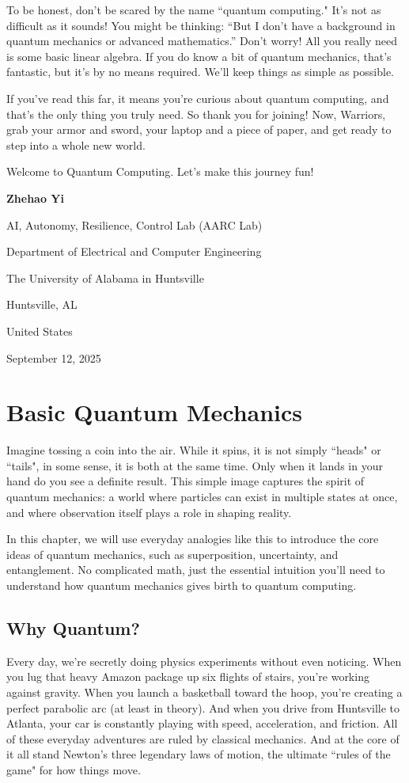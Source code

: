\documentclass[12pt,oneside]{book}
\begin{document}
To be honest, don't be scared by the name ``quantum computing." It's not as difficult as it sounds! You might be thinking: ``But I don't have a background in quantum mechanics or advanced mathematics.” Don't worry! All you really need is some basic linear algebra. If you do know a bit of quantum mechanics, that's fantastic, but it's by no means required. We'll keep things as simple as possible.

If you've read this far, it means you're curious about quantum computing, and that's the only thing you truly need. So thank you for joining! Now, Warriors, grab your armor and sword, your laptop and a piece of paper, and get ready to step into a whole new world.

Welcome to Quantum Computing. Let's make this journey fun!

\vspace{2em}
\textbf{Zhehao Yi}

AI, Autonomy, Resilience, Control Lab (AARC Lab)

Department of Electrical and Computer Engineering

The University of Alabama in Huntsville

Huntsville, AL 

United States

September 12, 2025

\chapter{Basic Quantum Mechanics}
Imagine tossing a coin into the air. While it spins, it is not simply ``heads" or ``tails", in some sense, it is both at the same time. Only when it lands in your hand do you see a definite result. This simple image captures the spirit of quantum mechanics: a world where particles can exist in multiple states at once, and where observation itself plays a role in shaping reality.

In this chapter, we will use everyday analogies like this to introduce the core ideas of quantum mechanics, such as superposition, uncertainty, and entanglement. No complicated math, just the essential intuition you'll need to understand how quantum mechanics gives birth to quantum computing.
\section{Why Quantum?}
Every day, we're secretly doing physics experiments without even noticing. When you lug that heavy Amazon package up six flights of stairs, you’re working against gravity. When you launch a basketball toward the hoop, you’re creating a perfect parabolic arc (at least in theory). And when you drive from Huntsville to Atlanta, your car is constantly playing with speed, acceleration, and friction. All of these everyday adventures are ruled by classical mechanics. And at the core of it all stand Newton’s three legendary laws of motion, the ultimate ``rules of the game" for how things move.
\end{document}
